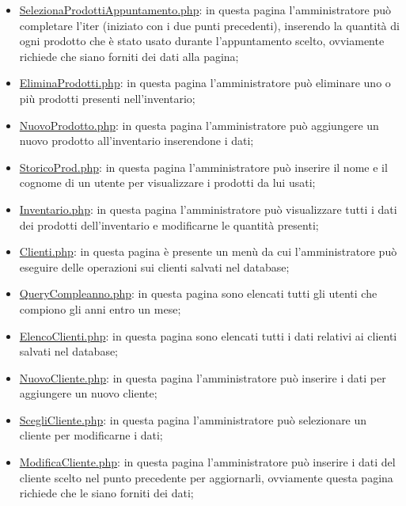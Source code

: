 {\begin{itemize}
		\item \underline{SelezionaProdottiAppuntamento.php}: in questa pagina l'amministratore può completare l'iter (iniziato con i due punti precedenti), inserendo la quantità di ogni prodotto che è stato usato durante l'appuntamento scelto, ovviamente richiede che siano forniti dei dati alla pagina;
		\item \href{http://tecweb2016.studenti.math.unipd.it/smarches/EliminaProdotti.php}{EliminaProdotti.php}: in questa pagina l'amministratore può eliminare uno o più prodotti presenti nell'inventario;
		\item \href{http://tecweb2016.studenti.math.unipd.it/smarches/NuovoProdotto.php}{NuovoProdotto.php}: in questa pagina l'amministratore può aggiungere un nuovo prodotto all'inventario inserendone i dati;
		\item \href{http://tecweb2016.studenti.math.unipd.it/smarches/StoricoProd.php}{StoricoProd.php}: in questa pagina l'amministratore può inserire il nome e il cognome di un utente per visualizzare i prodotti da lui usati;
		\item \href{http://tecweb2016.studenti.math.unipd.it/smarches/Inventario.php}{Inventario.php}: in questa pagina l'amministratore può visualizzare tutti i dati dei prodotti dell'inventario e modificarne le quantità presenti;
		\item \href{http://tecweb2016.studenti.math.unipd.it/smarches/Clienti.php}{Clienti.php}: in questa pagina è presente un menù da cui l'amministratore può eseguire delle operazioni sui clienti salvati nel database;
		\item \href{http://tecweb2016.studenti.math.unipd.it/smarches/QueryCompleanno.php}{QueryCompleanno.php}: in questa pagina sono elencati tutti gli utenti che compiono gli anni entro un mese;
		\item \href{http://tecweb2016.studenti.math.unipd.it/smarches/ElencoClienti.php}{ElencoClienti.php}: in questa pagina sono elencati tutti i dati relativi ai clienti salvati nel database;
		\item \href{http://tecweb2016.studenti.math.unipd.it/smarches/NuovoCliente.php}{NuovoCliente.php}: in questa pagina l'amministratore può inserire i dati per aggiungere un nuovo cliente;
		\item \href{http://tecweb2016.studenti.math.unipd.it/smarches/ScegliCliente.php}{ScegliCliente.php}: in questa pagina l'amministratore può selezionare un cliente per modificarne i dati;
		\item \underline{ModificaCliente.php}: in questa pagina l'amministratore può inserire i dati del cliente scelto nel punto precedente per aggiornarli, ovviamente questa pagina richiede che le siano forniti dei dati;

\end{itemize}}
